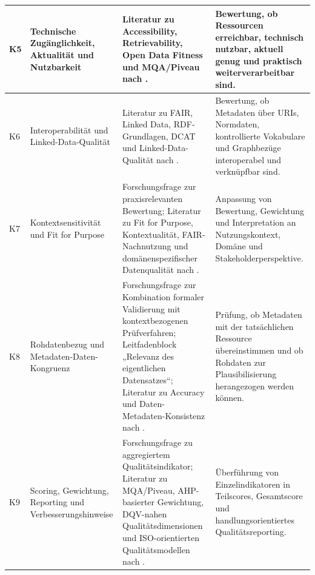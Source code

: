 \begin{center}
\begin{longtable}{p{} p{} p{} p{}}
K5 & Technische Zugänglichkeit, Aktualität und Nutzbarkeit & Literatur zu Accessibility, Retrievability, Open Data Fitness und MQA/Piveau nach \cite{wilkinson2016fair, data_europa, Neumaier2016MetadataQuality, kubler2018comparison, wentzel2023extensive}. & Bewertung, ob Ressourcen erreichbar, technisch nutzbar, aktuell genug und praktisch weiterverarbeitbar sind. \\ \hline

K6 & Interoperabilität und Linked-Data-Qualität & Literatur zu FAIR, Linked Data, RDF-Grundlagen, DCAT und Linked-Data-Qualität nach \cite{wilkinson2016fair, W3CRDF11Concepts, W3CDCAT3, Zaveri2016LinkedDataQuality, Gayo2015LinkedDataValidationQuality}. & Bewertung, ob Metadaten über URIs, Normdaten, kontrollierte Vokabulare und Graphbezüge interoperabel und verknüpfbar sind. \\ \hline

K7 & Kontextsensitivität und Fit for Purpose & Forschungsfrage zur praxisrelevanten Bewertung; Literatur zu Fit for Purpose, Kontextualität, FAIR-Nachnutzung und domänenspezifischer Datenqualität nach \cite{wang1996beyond, StrongLeeWang1997, wand1996anchoring, wilkinson2016fair, Ubaldi2013OGD}. & Anpassung von Bewertung, Gewichtung und Interpretation an Nutzungskontext, Domäne und Stakeholderperspektive. \\ \hline

K8 & Rohdatenbezug und Metadaten-Daten-Kongruenz & Forschungsfrage zur Kombination formaler Validierung mit kontextbezogenen Prüfverfahren; Leitfadenblock „Relevanz des eigentlichen Datensatzes“; Literatur zu Accuracy und Daten-Metadaten-Konsistenz nach \cite{wang1996beyond, wand1996anchoring, StrongLeeWang1997, noguerasiso_quality_metadata}. & Prüfung, ob Metadaten mit der tatsächlichen Ressource übereinstimmen und ob Rohdaten zur Plausibilisierung herangezogen werden können. \\ \hline

K9 & Scoring, Gewichtung, Reporting und Verbesserungshinweise & Forschungsfrage zu aggregiertem Qualitätsindikator; Literatur zu MQA/Piveau, AHP-basierter Gewichtung, DQV-nahen Qualitätsdimensionen und ISO-orientierten Qualitätsmodellen nach \cite{data_europa, kubler2018comparison, Neumaier2016MetadataQuality, wentzel2023extensive, iso25012, W3CDQV, ISO19157}. & Überführung von Einzelindikatoren in Teilscores, Gesamtscore und handlungsorientiertes Qualitätsreporting. \\ \hline


\end{longtable}
\end{center}
